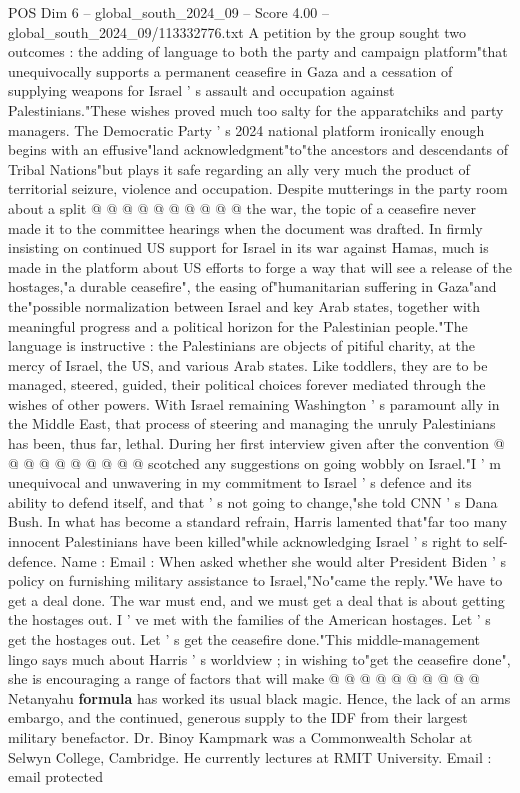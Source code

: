 \begin{textsample}{POS Dim 6 – global\_south\_2024\_09 – Score 4.00 – global\_south\_2024\_09/113332776.txt}
A petition by the group sought two outcomes : the adding of language to both the party and campaign platform"that unequivocally supports a permanent ceasefire in Gaza and a cessation of supplying weapons for Israel ' s assault and occupation against Palestinians."These wishes proved much too salty for the apparatchiks and party managers.
The Democratic Party ' s 2024 national platform ironically enough begins with an effusive"land acknowledgment"to"the ancestors and descendants of Tribal Nations"but plays it safe regarding an ally very much the product of territorial seizure, violence and occupation.
Despite mutterings in the party room about a split @ @ @ @ @ @ @ @ @ @ the war, the topic of a ceasefire never made it to the committee hearings when the document was drafted.
In firmly insisting on continued US support for Israel in its war against Hamas, much is made in the platform about US efforts to forge a way that will see a release of the hostages,"a durable ceasefire", the easing of"humanitarian suffering in Gaza"and the"possible normalization between Israel and key Arab states, together with meaningful progress and a political horizon for the Palestinian people."The language is instructive : the Palestinians are objects of pitiful charity, at the mercy of Israel, the US, and various Arab states.
Like toddlers, they are to be managed, steered, guided, their political choices forever mediated through the wishes of other powers.
With Israel remaining Washington ' s paramount ally in the Middle East, that process of steering and managing the unruly Palestinians has been, thus far, lethal.
During her first interview given after the convention @ @ @ @ @ @ @ @ @ @ scotched any suggestions on going wobbly on Israel."I ' m unequivocal and unwavering in my commitment to Israel ' s defence and its ability to defend itself, and that ' s not going to change,"she told CNN ' s Dana Bush.
In what has become a standard refrain, Harris lamented that"far too many innocent Palestinians have been killed"while acknowledging Israel ' s right to self-defence.
Name : Email : When asked whether she would alter President Biden ' s policy on furnishing military assistance to Israel,"No"came the reply."We have to get a deal done.
The war must end, and we must get a deal that is about getting the hostages out.
I ' ve met with the families of the American hostages.
Let ' s get the hostages out.
Let ' s get the ceasefire done."This middle-management lingo says much about Harris ' s worldview ; in wishing to"get the ceasefire done", she is encouraging a range of factors that will make @ @ @ @ @ @ @ @ @ @ Netanyahu \textbf{formula} has worked its usual black magic.
Hence, the lack of an arms embargo, and the continued, generous supply to the IDF from their largest military benefactor.
Dr.
Binoy Kampmark was a Commonwealth Scholar at Selwyn College, Cambridge.
He currently lectures at RMIT University.
Email : email protected

\end{textsample}

